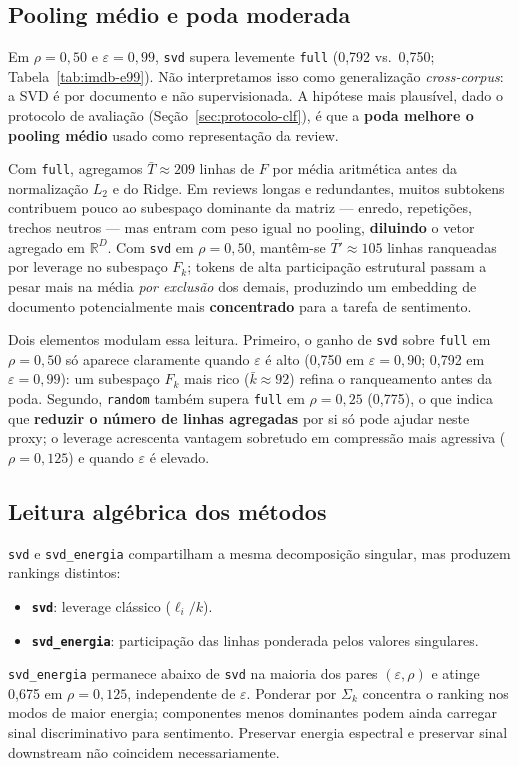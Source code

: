 \subsection{Pooling médio e poda moderada}\label{sec:pooling-poda}

Em $\rho=0{,}50$ e $\varepsilon=0{,}99$, \texttt{svd} supera levemente \texttt{full} (0,792 vs.\ 0,750; Tabela~\ref{tab:imdb-e99}). Não interpretamos isso como generalização \emph{cross-corpus}: a SVD é por documento e não supervisionada. A hipótese mais plausível, dado o protocolo de avaliação (Seção~\ref{sec:protocolo-clf}), é que a \textbf{poda melhore o pooling médio} usado como representação da review.

Com \texttt{full}, agregamos $\bar{T}\approx 209$ linhas de $F$ por média aritmética antes da normalização $L_2$ e do Ridge. Em reviews longas e redundantes, muitos subtokens contribuem pouco ao subespaço dominante da matriz --- enredo, repetições, trechos neutros --- mas entram com peso igual no pooling, \textbf{diluindo} o vetor agregado em $\mathbb{R}^D$. Com \texttt{svd} em $\rho=0{,}50$, mantêm-se $\bar{T'}\approx 105$ linhas ranqueadas por leverage no subespaço $F_k$; tokens de alta participação estrutural passam a pesar mais na média \emph{por exclusão} dos demais, produzindo um embedding de documento potencialmente mais \textbf{concentrado} para a tarefa de sentimento.

Dois elementos modulam essa leitura. Primeiro, o ganho de \texttt{svd} sobre \texttt{full} em $\rho=0{,}50$ só aparece claramente quando $\varepsilon$ é alto (0,750 em $\varepsilon=0{,}90$; 0,792 em $\varepsilon=0{,}99$): um subespaço $F_k$ mais rico ($\bar{k}\approx 92$) refina o ranqueamento antes da poda. Segundo, \texttt{random} também supera \texttt{full} em $\rho=0{,}25$ (0,775), o que indica que \textbf{reduzir o número de linhas agregadas} por si só pode ajudar neste proxy; o leverage acrescenta vantagem sobretudo em compressão mais agressiva ($\rho=0{,}125$) e quando $\varepsilon$ é elevado.
\subsection{Leitura algébrica dos métodos}

\texttt{svd} e \texttt{svd\_energia} compartilham a mesma decomposição singular, mas produzem rankings distintos:
\begin{itemize}
    \item \textbf{\texttt{svd}}: leverage clássico ($\ell_i/k$).
    \item \textbf{\texttt{svd\_energia}}: participação das linhas ponderada pelos valores singulares.
\end{itemize}
\texttt{svd\_energia} permanece abaixo de \texttt{svd} na maioria dos pares $(\varepsilon, \rho)$ e atinge 0,675 em $\rho=0{,}125$, independente de $\varepsilon$. Ponderar por $\Sigma_k$ concentra o ranking nos modos de maior energia; componentes menos dominantes podem ainda carregar sinal discriminativo para sentimento. Preservar energia espectral e preservar sinal downstream não coincidem necessariamente.

